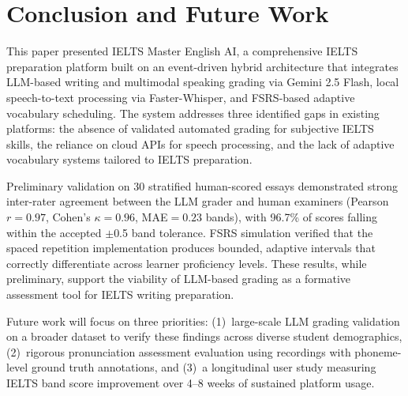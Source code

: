 \documentclass{IEEEtran}
\begin{document}
\section{Conclusion and Future Work}
\label{sec:conclusion}

This paper presented IELTS Master English AI, a comprehensive IELTS preparation platform built on an event-driven hybrid architecture that integrates LLM-based writing and multimodal speaking grading via Gemini 2.5 Flash, local speech-to-text processing via Faster-Whisper, and FSRS-based adaptive vocabulary scheduling. The system addresses three identified gaps in existing platforms: the absence of validated automated grading for subjective IELTS skills, the reliance on cloud APIs for speech processing, and the lack of adaptive vocabulary systems tailored to IELTS preparation.

Preliminary validation on 30 stratified human-scored essays demonstrated strong inter-rater agreement between the LLM grader and human examiners (Pearson $r=0.97$, Cohen's $\kappa=0.96$, MAE$=0.23$ bands), with 96.7\% of scores falling within the accepted $\pm$0.5 band tolerance. FSRS simulation verified that the spaced repetition implementation produces bounded, adaptive intervals that correctly differentiate across learner proficiency levels. These results, while preliminary, support the viability of LLM-based grading as a formative assessment tool for IELTS writing preparation.

Future work will focus on three priorities: (1)~large-scale LLM grading validation on a broader dataset to verify these findings across diverse student demographics, (2)~rigorous pronunciation assessment evaluation using recordings with phoneme-level ground truth annotations, and (3)~a longitudinal user study measuring IELTS band score improvement over 4--8 weeks of sustained platform usage.

\end{document}
